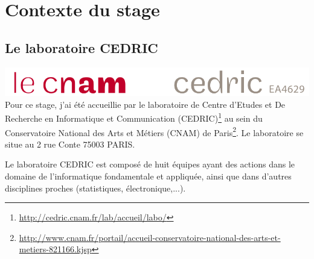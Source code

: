 \documentclass{article}
\begin{document}
\section{Contexte du stage}
	\subsection{Le laboratoire CEDRIC}
		\centering \includegraphics[scale=0.35]{include/logo-cedric.PNG}\\
		Pour ce stage, j'ai été accueillie par le laboratoire de Centre d'Etudes et De Recherche en Informatique et Communication (CEDRIC)\footnote{\href{http://cedric.cnam.fr/lab/accueil/labo/}{http://cedric.cnam.fr/lab/accueil/labo/}} au sein du Conservatoire National des Arts et Métiers (CNAM) de Paris\footnote{\href{http://www.cnam.fr/portail/accueil-conservatoire-national-des-arts-et-metiers-821166.kjsp}{http://www.cnam.fr/portail/accueil-conservatoire-national-des-arts-et-metiers-821166.kjsp}}. 
		Le laboratoire se situe au 2 rue Conte 75003 PARIS.\par
		Le laboratoire CEDRIC est composé de huit équipes ayant des actions dans le domaine de l'informatique fondamentale et appliquée, ainsi que dans d'autres disciplines proches (statistiques, électronique,...).
\end{document}

